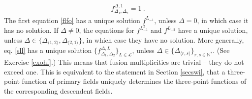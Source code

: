 \documentclass[12pt, a4paper, notitlepage, twoside]{report}
\numberwithin{equation}{section}
\theoremstyle{break}
\begin{document}
\begin{align}
 f^{\Delta,1}_{\Delta_1,\Delta_2} = 1\ .
\label{fo}
\end{align}
The first equation \eqref{flfo} has a unique solution $f^{L_{-1}}$, unless $\Delta=0$, in which case it has no solution.
If $\Delta \neq 0$, the equations for $f^{L_{-1}^2}$ and $f^{L_{-2}}$ have a unique solution, unless $\Delta \in \{\Delta_{\langle 1,2 \rangle}, \Delta_{\langle 2,1 \rangle}\}$, in which case they have no solution.
More generally, eq. \eqref{sll} has a unique solution $\{ f^{\Delta,L}_{\Delta_1,\Delta_2} \}_{L\in\mathcal{L}}$, unless $\Delta\in\{\Delta_{\langle r,s \rangle}\}_{r,s\in {\mathbb{N}}^*}$. 
(See Exercise \ref{exohf}.) This means that fusion multiplicities are trivial -- they do not exceed one. 
This is equivalent to the statement in Section \ref{secswi}, that a three-point function of primary fields uniquely determines the three-point functions of the corresponding descendent fields. 
\end{document}
